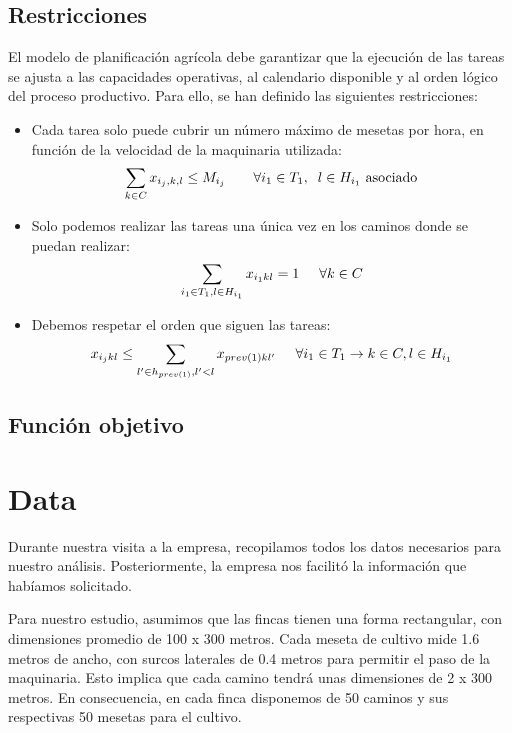 \section*{Restricciones}
El modelo de planificación agrícola debe garantizar que la ejecución de las tareas se ajusta a las capacidades operativas,
al calendario disponible y al orden lógico del proceso productivo. Para ello, se han definido las siguientes restricciones:
\begin{itemize}
    \item Cada tarea solo puede cubrir un número máximo de mesetas por hora, en función de la velocidad de la maquinaria utilizada:
          \[
            \sum_{k\in C}x_{i_j,k,l} \leq M_{i_j} \qquad \forall i_1 \in T_1, \hspace{0.2cm} l\in H_{i_1} \text{   asociado}
          \]
    \item  Solo podemos realizar las tareas una única vez en los caminos donde se puedan realizar:
          \[
            \sum_{i_1 \in T_1, l\in H_{i_1}}x_{i_1 kl} =1 \hspace{0.5cm} \forall k \in C
          \]
    \item Debemos respetar el orden que siguen las tareas:
          \[
            x_{i_j kl} \leq \sum_{l' \in h_{prev(1)}, l'<l}x_{prev(1)kl'} \hspace{0.5cm} \forall i_1\in T_1 \rightarrow k\in C, l \in H_{i_1}
          \]
\end{itemize}


\section*{Función objetivo}




\chapter*{Data}

Durante nuestra visita a la empresa, recopilamos todos los datos necesarios para nuestro análisis. 
Posteriormente, la empresa nos facilitó la información que habíamos solicitado.

Para nuestro estudio, asumimos que las fincas tienen una forma rectangular, con dimensiones promedio
 de 100 x 300 metros. Cada meseta de cultivo mide 1.6 metros de ancho, con surcos laterales de 0.4 metros
  para permitir el paso de la maquinaria. Esto implica que cada camino tendrá unas dimensiones de 2 x 300 metros.
   En consecuencia, en cada finca disponemos de 50 caminos y sus respectivas 50 mesetas para el cultivo.

